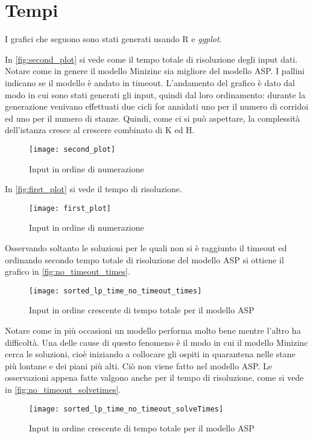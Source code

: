
\section{Tempi}
I grafici che seguono sono stati generati usando R e \emph{ggplot}.

\noindent
In \autoref{fig:second_plot} si vede come il tempo totale di risoluzione degli input dati.
Notare come in genere il modello Minizinc sia migliore del modello ASP.
I pallini indicano se il modello è andato in timeout.
L'andamento del grafico è dato dal modo in cui sono stati generati gli input, quindi dal loro ordinamento: durante la generazione venivano effettuati due cicli for annidati uno per il numero di corridoi ed uno per il numero di stanze.
Quindi, come ci si può aspettare, la complessità dell'istanza cresce al crescere combinato di K ed H.
\begin{figure}[ht]
  \centering
  \texttt{[image: second\_plot]}
  \caption{Input in ordine di numerazione}
  \label{fig:second_plot}
\end{figure}

In \autoref{fig:first_plot} si vede il tempo di risoluzione.
\begin{figure}[ht]
  \centering
  \texttt{[image: first\_plot]}
  \caption{Input in ordine di numerazione}
  \label{fig:first_plot}
\end{figure}
\cleardoublepage

Osservando soltanto le soluzioni per le quali non si è raggiunto il timeout ed ordinando secondo tempo totale di risoluzione del modello ASP si ottiene il grafico in \autoref{fig:no_timeout_times}.
\begin{figure}[ht]
  \centering
  \texttt{[image: sorted\_lp\_time\_no\_timeout\_times]}
  \caption{Input in ordine crescente di tempo totale per il modello ASP}
  \label{fig:no_timeout_times}
\end{figure}
Notare come in più occasioni un modello performa molto bene mentre l'altro ha difficoltà.
Una delle cause di questo fenomeno è il modo in cui il modello Minizinc cerca le soluzioni, cioè iniziando a collocare gli ospiti in quarantena nelle stane più lontane e dei piani più alti.
Ciò non viene fatto nel modello ASP.
Le osservazioni appena fatte valgono anche per il tempo di risoluzione, come si vede in \autoref{fig:no_timeout_solvetimes}.
\begin{figure}[ht]
  \centering
  \texttt{[image: sorted\_lp\_time\_no\_timeout\_solveTimes]}
  \caption{Input in ordine crescente di tempo totale per il modello ASP}
  \label{fig:no_timeout_solvetimes}
\end{figure}

